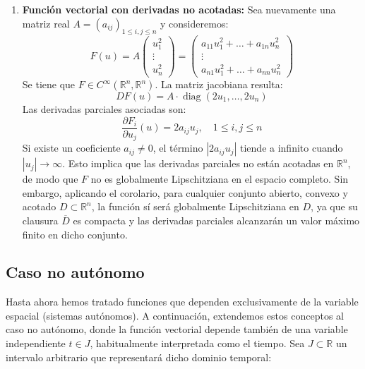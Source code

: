 {\begin{enumerate}
        \item \textbf{Función vectorial con derivadas no acotadas:}
        Sea nuevamente una matriz real $A = (a_{ij})_{1 \leq i,j \leq n}$ y consideremos:
        \[
            F(u) = A \begin{pmatrix} u_1^2 \\ \vdots \\ u_n^2 \end{pmatrix}
            =
            \begin{pmatrix}
                a_{11} u_1^2 + \ldots + a_{1n} u_n^2 \\
                \vdots \\
                a_{n1} u_1^2 + \ldots + a_{nn} u_n^2
            \end{pmatrix}
        \]
        Se tiene que $F \in C^\infty(\mathbb{R}^n, \mathbb{R}^n)$. La matriz jacobiana resulta:
        \[
            DF(u) = A \cdot \operatorname{diag}(2 u_1, \ldots, 2 u_n)
        \]
        Las derivadas parciales asociadas son:
        \[
            \frac{\partial F_i}{\partial u_j}(u) = 2 a_{ij} u_j, \quad 1 \leq i,j \leq n
        \]
        Si existe un coeficiente $a_{ij} \neq 0$, el término $|2 a_{ij} u_j|$ tiende a infinito cuando $|u_j| \to \infty$. Esto implica que las derivadas parciales no están acotadas en $\mathbb{R}^n$, de modo que $F$ no es globalmente Lipschitziana en el espacio completo. Sin embargo, aplicando el corolario, para cualquier conjunto abierto, convexo y acotado $D \subset \mathbb{R}^n$, la función sí será globalmente Lipschitziana en $D$, ya que su clausura $\overline{D}$ es compacta y las derivadas parciales alcanzarán un valor máximo finito en dicho conjunto.
    \end{enumerate}    
}


\subsection{Caso no autónomo}

Hasta ahora hemos tratado funciones que dependen exclusivamente de la variable espacial (sistemas autónomos). A continuación, extendemos estos conceptos al caso no autónomo, donde la función vectorial depende también de una variable independiente $t \in J$, habitualmente interpretada como el tiempo. Sea $J \subset \mathbb{R}$ un intervalo arbitrario que representará dicho dominio temporal:

